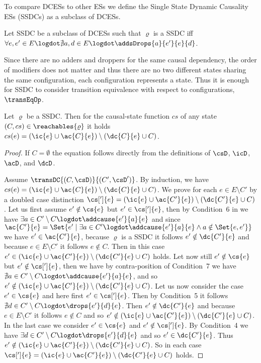 \documentclass[runningheads,a4paper]{llncs}
\begin{document}
To compare DCESs to other ESs we define the Single State Dynamic Causality ESs
(SSDCs) as a subclass of DCESs.

\begin{definition}
\label{def:SingleStateDC}
Let SSDC be a subclass of DCESs such that $\varrho$ is a SSDC iff
$\forall e, e' \in E \logdot \nexists a,d \in E
		\logdot \addsDrops{a}{e'}{e}{d}$.
\end{definition}
Since there are no adders and droppers for the same causal dependency, the order
of modifiers does not matter and thus there are no two different states sharing
the same configuration, \ie each configuration represents a state. Thus it is
enough for SSDC to consider transition equivalence with respect to
configurations, \ie $\transEqOp$.

\begin{lemma}
\label{lma:SingleCausalState}
Let $\varrho $ be a SSDC. Then for the causal-state function $cs$ of any
state $(C, cs) \in \reachables{\varrho}$ it holds $cs(e) = (\ic{e} \cup
\ac{C}{e}) \setminus (\dc{C}{e}\cup C)$.
\end{lemma}

\begin{proof}
If $C=\emptyset$ the equation follows directly from the definitions of $\csD$, $\icD$, $\acD$, and $\dcD$.

Assume $\transDC{(C,\csD)}{(C',\csD')}$. By induction, we have $cs(e) = (\ic{e} \cup\ac{C}{e}) \setminus (\dc{C}{e}\cup C)$.
We prove for each $e\in E\setminus C'$ by a doubled case distinction $\cs[']{e}=(\ic{e} \cup\ac{C'}{e}) \setminus (\dc{C'}{e}\cup C)$. Let us first assume $e'\notin \cs{e}$ but $e'\in \cs[']{e}$, then by Condition~6 in \cite{dynamicCausality15} we have $\exists a\in C'\setminus C\logdot \addcause{e'}{a}{e}$ and since $\ac{C'}{e}=\Set{ e' \mid \exists a \in C'\logdot \addcause{e'}{a}{e} \land a \notin \Set{ e, e' } }$ we have $e'\in \ac{C'}{e}$, because $\varrho$ is a SSDC it follows $e'\notin\dc{C'}{e}$ and because $e\in E\setminus C'$ it follows $e\notin C$. Then in this case $e'\in(\ic{e} \cup\ac{C'}{e}) \setminus (\dc{C'}{e}\cup C)$ holds. Let now still $e'\notin \cs{e}$ but $e'\notin \cs[']{e}$, then we have by contra-position of Condition~7 we have $\nexists a\in C'\setminus C\logdot \addcause{e'}{a}{e}$, and so  $e'\notin(\ic{e} \cup\ac{C'}{e}) \setminus (\dc{C'}{e}\cup C)$. Let us now consider the case $e'\in\cs{e}$ and here first $e'\in\cs[']{e}$. Then by Condition~5 it follows $\nexists d\in C'\setminus C\logdot \drops{e'}{d}{e}$. Then $e'\notin\dc{C'}{e}$ and because $e\in E\setminus C'$ it follows $e\notin C$ and so $e'\notin(\ic{e} \cup\ac{C'}{e}) \setminus (\dc{C'}{e}\cup C)$. In the last case we consider $e'\in\cs{e}$ and  $e'\notin\cs[']{e}$. By Condition~4 we have $\exists d\in C'\setminus C\logdot \drops{e'}{d}{e}$ and so $e'\in\dc{C'}{e}$. Thus $e'\notin(\ic{e} \cup\ac{C'}{e}) \setminus (\dc{C'}{e}\cup C)$. So in each case $\cs[']{e}=(\ic{e} \cup\ac{C'}{e}) \setminus (\dc{C'}{e}\cup C)$ holds.
\end{proof}
\end{document}
